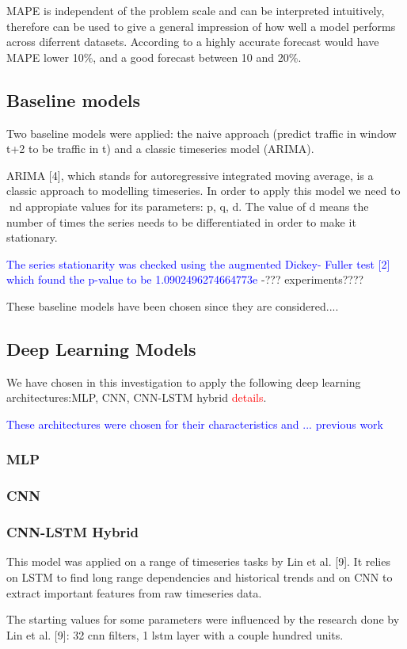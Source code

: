 MAPE is independent of the problem scale and 
can be interpreted intuitively, therefore can be used to give a general impression of how well a model
performs across diferrent datasets. According to \cite{mape_values} a highly accurate forecast would 
have MAPE lower 10\%, and a good forecast between 10 and 20\%.

\subsection{Baseline models}
 Two baseline models were applied: the naive approach
(predict traffic in window t+2 to be traffic in t) and a classic timeseries model (ARIMA).

ARIMA [4], which stands for autoregressive integrated moving average, is a classic approach
to modelling timeseries. In order to apply this model we need to nd appropiate
values for its parameters: p, q, d.
The value of d means the number of times the series needs to be differentiated in order
to make it stationary. 

\textcolor{blue}{The series stationarity was checked using the augmented Dickey-
Fuller test [2] which found the p-value to be 1.0902496274664773e} -??? experiments????

These baseline models have been chosen since they are considered....

\subsection{Deep Learning Models}

We have chosen in this investigation to apply the following deep learning architectures:MLP, CNN, CNN-LSTM hybrid  \textcolor{red}{details}.

\textcolor{blue}{These architectures were chosen for their characteristics and ... previous work}

\subsubsection{MLP}

\subsubsection{CNN}

\subsubsection{CNN-LSTM Hybrid}
This model was applied on a range of timeseries tasks by Lin et al. [9]. It relies on
LSTM to find long range dependencies and historical trends and on CNN to extract important features from raw timeseries data. 

The starting values for some parameters
were influenced by the research done by Lin et al. [9]: 32 cnn filters, 1 lstm layer with a couple hundred units.


